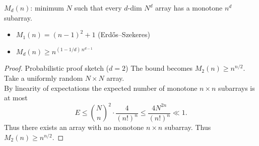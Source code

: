 








\begin{frame}{}
    \( M_d(n) \): minimum \( N \) such that every \( d \)-dim
  \( N^d \) array has a monotone \( n^d \) subarray.
  \begin{itemize}
    \item $M_1(n) = (n-1)^2 + 1$ \quad (Erd\H{o}s--Szekeres)
    \item $M_d(n) \geq n^{(1-1/d)\,n^{d-1}}$
  \end{itemize}
  \pause
  \begin{proof}{Probabilistic proof sketch ($d=2$)}
      The bound becomes $M_2(n) \geq n^{n/2}$. \\
      Take a uniformly random $N \times N$ array. \\
      By linearity of expectations the expected number of monotone 
      $n \times n$ subarrays is at most
      \[
          E \leq \binom{N}{n}^2 \cdot \frac{4}{(n!)^n} 
          \leq \frac{4N^{2n}}{(n!)^n}\ll1.
      \]
      \pause
      Thus there exists an array with no monotone $n\times n$ subarray.
      Thus $M_2(n) \geq n^{n/2}$.
  \end{proof}
\end{frame}


